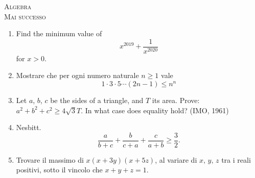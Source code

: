 \documentclass[a4paper]{article}
\theoremstyle{remark}
\theoremstyle{definition}
\begin{document}
\newpage
\begin{center}
	\vspace*{0,5 cm}
	{\Huge \textsc{Algebra}} \\
	\vspace{0,5 cm}
	\textsc{Mai successo}
	\thispagestyle{empty}
	\vspace{0,7 cm}
\end{center}
\normalsize
\begin{enumerate}
	\item Find the minimum value of
	\[ x^{2019} + \frac{1}{x^{2020}} \]
	for $ x > 0 $.
	
	\item Mostrare che per ogni numero naturale $ n \geq 1 $ vale
	\[ 1 \cdot 3 \cdot 5 \cdots (2n-1) \leq n^n \]
	
	\item Let $ a $, $ b $, $ c $ be the sides of a triangle, and $ T $ its area. Prove: $ a^2+b^2+c^2 \geq 4\sqrt{3}T $. In what case does
	equality hold? (IMO, 1961)
	
	\item Nesbitt.
	\[ \frac{a}{b+c} + \frac{b}{c+a} + \frac{c}{a + b} \geq \frac{3}{2}. \]
	
	\item Trovare il massimo di $ x(x + 3y)(x + 5z) $, al variare di $ x, \, y, \, z $ tra i reali positivi, sotto il vincolo che $ x + y +z = 1 $.
	
\end{enumerate}
\end{document}
